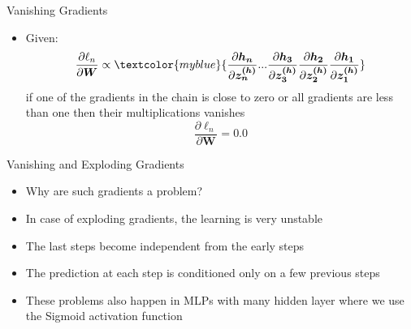 \begin{frame}{Vanishing Gradients}
    \begin{itemize}
        \item Given: 
                \begin{equation*}
    \frac{\partial \ell_n}{\partial \bm{W}}  \propto  
        \textcolor{myblue}{
        \frac{\partial \bm{h_n}}{\partial \bm{z^{(h)}_n}} ...\frac{\partial \bm{h_3}}{\partial \bm{z^{(h)}_3}}\frac{\partial \bm{h_2}}{\partial \bm{z^{(h)}_2}}\frac{\partial \bm{h_1}}{\partial \bm{z^{(h)}_1}}
        }
    \end{equation*}     
        if one of the gradients in the chain is close to zero or all gradients are less than one then their multiplications vanishes
        \begin{equation*}
            \frac{\partial \ell_n}{\partial \bm{W}} = 0.0
        \end{equation*}
    \end{itemize}
\end{frame}

\begin{frame}{Vanishing and Exploding Gradients}
    \begin{itemize}
        \item Why are such gradients a problem? 
        \item  In case of exploding gradients,  the learning is very unstable
        \item The last steps become independent from the early steps 
        \item The prediction at each step is conditioned only on a few previous steps 
        \item These problems also happen in MLPs with many hidden layer where we use the Sigmoid activation function

    \end{itemize}
\end{frame}

